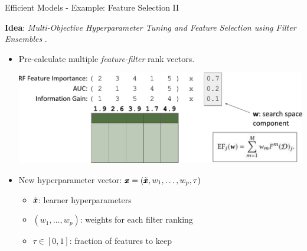 \documentclass[11pt,compress,t,notes=noshow,xcolor=table]{beamer}
\begin{document}
\begin{vbframe}{Efficient Models - Example: Feature Selection II}

\textbf{Idea}: \emph{Multi-Objective Hyperparameter Tuning and Feature Selection using Filter Ensembles}
.

\begin{itemize}
  \item Pre-calculate multiple \emph{feature-filter} rank vectors.

  \begin{center}
    \includegraphics[width=0.7\linewidth]{figure_man/mosmafs_presentation_p39.pdf}
  \end{center}

  \item New hyperparameter vector: $\pmb{x} = (\tilde{\pmb{x}}, w_1,\dots,w_p, \tau)$
  \begin{itemize}
    \item $\tilde{\pmb{x}}$: learner hyperparameters
    \item $(w_1,\dots,w_p)$: weights for each filter ranking
    \item $\tau\in [0,1]$: fraction of features to keep
  \end{itemize}
\end{itemize}

\end{vbframe}
\end{document}
